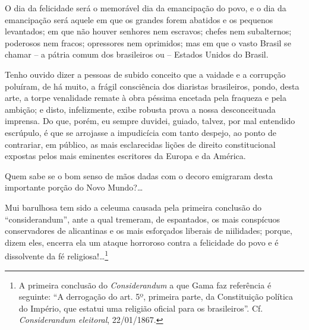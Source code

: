 O dia da felicidade será o memorável dia da emancipação do povo, e o dia
da emancipação será aquele em que os grandes forem abatidos e os
pequenos levantados; em que não houver senhores nem escravos; chefes nem
subalternos; poderosos nem fracos; opressores nem oprimidos; mas em que
o vasto Brasil se chamar -- a pátria comum dos brasileiros ou -- Estados
Unidos do Brasil.

Tenho ouvido dizer a pessoas de subido conceito que a vaidade e a
corrupção poluíram, de há muito, a frágil consciência dos diaristas
brasileiros, pondo, desta arte, a torpe venalidade remate à obra péssima
encetada pela fraqueza e pela ambição; e disto, infelizmente, exibe
robusta prova a nossa desconceituada imprensa. Do que, porém, eu sempre
duvidei, guiado, talvez, por mal entendido escrúpulo, é que se arrojasse
a impudicícia com tanto despejo, ao ponto de contrariar, em público, as
mais esclarecidas lições de direito constitucional expostas pelos mais
eminentes escritores da Europa e da América.

Quem sabe se o bom senso de mãos dadas com o decoro emigraram desta
importante porção do Novo Mundo?\ldots{}

Mui barulhosa tem sido a celeuma causada pela primeira conclusão do
``considerandum'', ante a qual tremeram, de espantados, os mais conspícuos
conservadores de alicantinas e os mais esforçados liberais de
niilidades; porque, dizem eles, encerra ela um ataque horroroso contra a
felicidade do povo e é dissolvente da fé religiosa!\ldots{}\footnote{A
  primeira conclusão do \emph{Considerandum} a que Gama faz referência é
  seguinte: ``A derrogação do art. 5º, primeira parte, da Constituição
  política do Império, que estatui uma religião oficial para os
  brasileiros''. Cf. \emph{Considerandum eleitoral}, 22/01/1867.}

